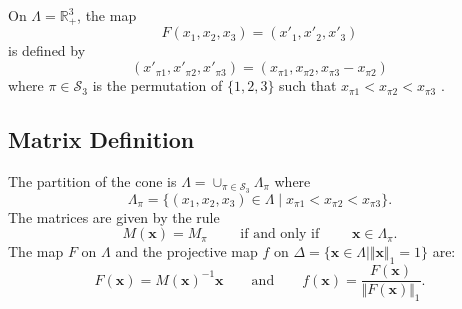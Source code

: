 On $\Lambda=\mathbb{R}^3_+$, the map
\[
F (x_1,x_2,x_3) = (x'_1,x'_2,x'_3)
\]
is defined by
\[
    (x'_{\pi 1}, x'_{\pi 2}, x'_{\pi 3}) =
    (x_{\pi 1}, x_{\pi 2}, x_{\pi 3}-x_{\pi 2})
\]
where $\pi\in\mathcal{S}_3$ is the permutation of $\{1,2,3\}$ such that
$x_{\pi 1}<x_{\pi 2}<x_{\pi 3}$ \cite{MR0111735}.
\subsection{Matrix Definition}
The partition of the cone is
$\Lambda=\cup_{\pi\in\mathcal{S}_3}\Lambda_\pi$ where
\[
    \Lambda_\pi = \{(x_1,x_2,x_3)\in\Lambda\mid 
	x_{\pi 1}< x_{\pi 2}< x_{\pi 3}\}.
\]
The matrices are given by the rule
\[
    M(\mathbf{x}) = M_\pi
    \qquad\text{ if and only if }\qquad
    \mathbf{x}\in\Lambda_\pi.
\]
The map $F$ on $\Lambda$ and
the projective map $f$ on
$\Delta=\{\mathbf{x}\in\Lambda\mid\Vert\mathbf{x}\Vert_1=1\}$ are:
\[
    F(\mathbf{x}) = M(\mathbf{x})^{-1}\mathbf{x}
    \qquad\text{and}\qquad
    f(\mathbf{x}) = \frac{F(\mathbf{x})}{\Vert F(\mathbf{x})\Vert_1}.
\]
